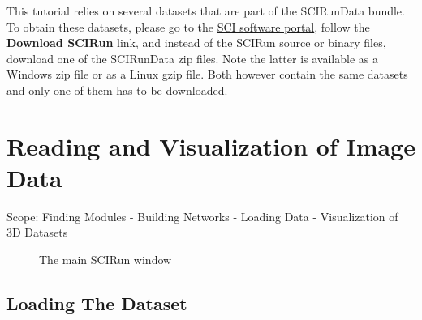 \documentclass[fleqn,11pt,openany]{book}
\begin{document}
This tutorial relies on several datasets that are part of the SCIRunData bundle.
To obtain these datasets, please go to the \href{http://software.sci.utah.edu}{SCI software portal}, follow the {\bf Download SCIRun} link, and instead of the SCIRun source or binary files, download one of the SCIRunData zip files.
Note the latter is available as a Windows zip file or as a Linux gzip file.
Both however contain the same datasets and only one of them has to be downloaded.



\chapter{Reading and Visualization of Image Data}

\begin{introduction}
Scope: Finding Modules - Building Networks  - Loading Data - Visualization of 3D Datasets
\end{introduction}

\begin{figure}
\caption{The main SCIRun window}\label{fig:MainSCIRunWindow}
\end{figure}

\section{Loading The Dataset}
\end{document}
